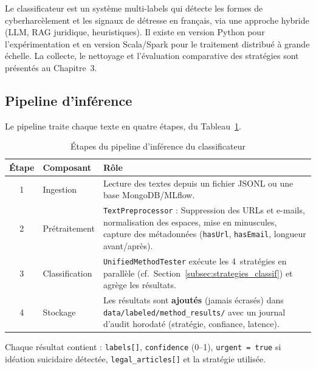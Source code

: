 Le classificateur est un système multi-labels qui détecte les formes de cyberharcèlement
et les signaux de détresse en français, via une approche hybride (LLM, RAG juridique,
heuristiques). Il existe en version Python pour l'expérimentation et en version
Scala/Spark \cite{chromadb} pour le traitement distribué à grande échelle.
La collecte, le nettoyage et l'évaluation comparative des stratégies sont présentés au Chapitre~3.

\subsection{Pipeline d'inférence}

Le pipeline traite chaque texte en quatre étapes, du Tableau~\ref{tab:pipeline_classif}.

\vspace{6pt}
\begin{table}[H]
\centering
\caption{Étapes du pipeline d'inférence du classificateur}
\label{tab:pipeline_classif}
\begin{tabular}{|c|p{3.2cm}|p{8.5cm}|}
\hline
\textbf{Étape} & \textbf{Composant} & \textbf{Rôle} \\
\hline
1 & Ingestion
  & Lecture des textes depuis un fichier JSONL ou une base MongoDB/MLflow. \\
\hline
2 & Prétraitement
  & \texttt{TextPreprocessor} : Suppression des URLs et e-mails, normalisation
    des espaces, mise en minuscules, capture des métadonnées
    (\texttt{hasUrl}, \texttt{hasEmail}, longueur avant/après). \\
\hline
3 & Classification
  & \texttt{UnifiedMethodTester} exécute les 4~stratégies en parallèle
    (cf.\ Section~\ref{subsec:strategies_classif}) et agrège les résultats. \\
\hline
4 & Stockage
  & Les résultats sont \textbf{ajoutés} (jamais écrasés) dans
    \texttt{data/labeled/method\_results/} avec un journal d'audit horodaté
    (stratégie, confiance, latence). \\
\hline
\end{tabular}
\end{table}

Chaque résultat contient : \texttt{labels[]}, \texttt{confidence} (0–1),
\texttt{urgent = true} si idéation suicidaire détectée, \texttt{legal\_articles[]} et la stratégie utilisée.

